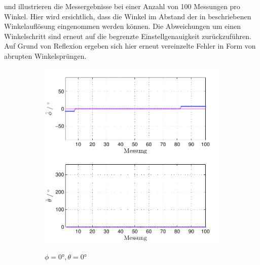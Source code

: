  und  illustrieren die Messergebnisse bei einer Anzahl von 100 Messungen pro Winkel. Hier wird ersichtlich, dass die Winkel im Abstand der in   beschriebenen Winkelauflösung eingenommen werden können. Die Abweichungen um einen Winkelschritt sind erneut auf die begrenzte Einstellgenauigkeit zurückzuführen. Auf Grund von Reflexion ergeben sich hier erneut vereinzelte Fehler in Form von abrupten Winkelsprüngen.


\begin{figure}
        \centering
        \begin{subfigure}[b]{0.48\textwidth}
                \centering
                \includegraphics[width=\textwidth]{grafiken/04_Echtzeitversuch/MALE_Phi_0_Theta_0}
                \label{fig:Foto_DSP_Draufsicht_Seitanansicht}
                \caption{$\phi=0°, \theta = 0°$}
        \end{subfigure}
        ~ %
        \begin{subfigure}[b]{0.48\textwidth}
                \centering

\end{subfigure}
\end{figure}
